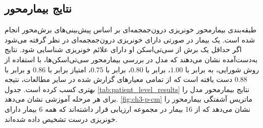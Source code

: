 \subsection{نتایج بیمارمحور}

طبقه‌بندی بیمارمحور خونریزی درون‌جمجمه‌ای بر اساس پیش‌بینی‌های برش‌محور انجام شده است. یک بیمار در صورتی دارای خونریزی درون‌جمجمه‌ای در نظر گرفته می‌شود اگر حداقل یک برش از سی‌تی‌اسکن او دارای علائم خونریزی شناسایی شود. نتایج به‌دست‌آمده نشان می‌دهند که مدل 
 در بررسی بیمارمحور سی‌تی‌اسکن‌ها، با استفاده از روش شورایی، به 
  برابر با
   $1.00$، 
برابر با
     $0.80$، 
      برابر با
       $0.75$،
        امتیاز
          برابر با
           $0.86$
            و 
             برابر با
              $0.88$ 
              دست یافته است که از تمامی معیارهای گزارش شده در سایر مطالعات، نتیجه بهتری کسب کرده است.
جدول \ref{tab:patient_level_results} نتایج بیمارمحور مدل  را برای هر مرحله آموزشی نشان می‌دهد.
\autoref{fig:ch3-p-cm}
ماتریس آشفتگی بیمارمحور را نشان می‌دهد که از 16 بیمار در مجموعه ارزیابی قرار داشته‌اند که همه 6 بیمار دارای خونریزی درست تشخیص داده شده‌اند.

